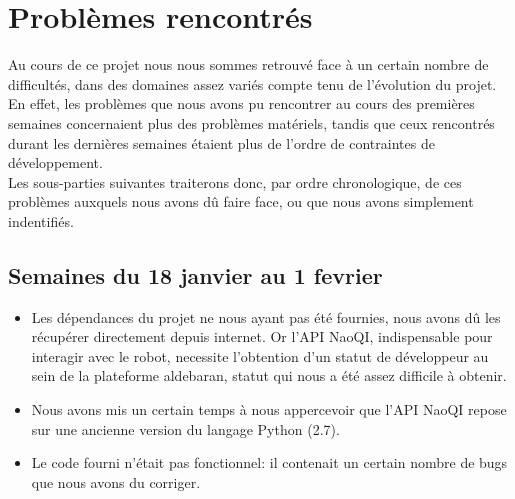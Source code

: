 \section{Problèmes rencontrés}
\label{sec:Problèmes rencontrés}

  \par Au cours de ce projet nous nous sommes retrouvé face à un certain nombre de difficultés, dans des domaines assez variés compte tenu de l'évolution du projet.
  En effet, les problèmes que nous avons pu rencontrer au cours des premières semaines concernaient plus des problèmes matériels,
  tandis que ceux rencontrés durant les dernières semaines étaient plus de l'ordre de contraintes de développement.\\
  Les sous-parties suivantes traiterons donc, par ordre chronologique, de ces problèmes auxquels nous avons dû faire face, ou que nous avons simplement indentifiés.\\

  \subsection{Semaines du 18 janvier au 1 fevrier}
    \label{sub:Semaines du 18 janvier au 1 fevrier}
    \begin{itemize}
      \item Les dépendances du projet ne nous ayant pas été fournies, nous avons dû les récupérer directement depuis internet.
      Or l'API NaoQI, indispensable pour interagir avec le robot, necessite l'obtention d'un statut de développeur au sein de la plateforme aldebaran, statut qui nous a été assez difficile à obtenir.
      \item Nous avons mis un certain temps à nous appercevoir que l'API NaoQI repose sur une ancienne version du langage Python (2.7).
      \item Le code fourni n'était pas fonctionnel: il contenait un certain nombre de bugs que nous avons du corriger.\\
    \end{itemize}




